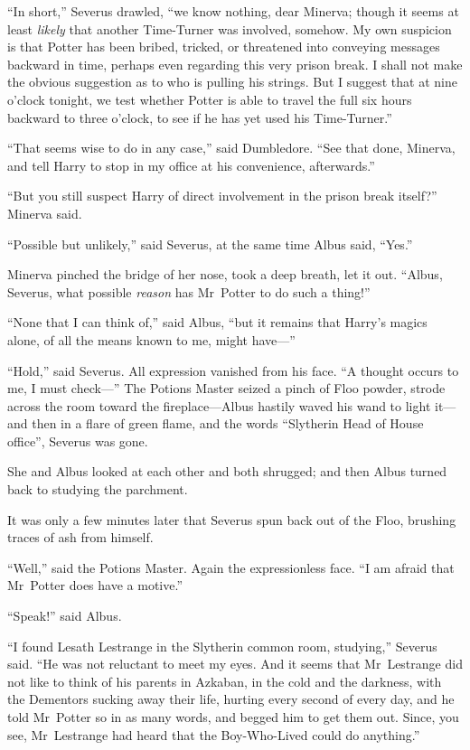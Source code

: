 “In short,” Severus drawled, “we know nothing, dear Minerva; though it seems at least \emph{likely} that another Time-Turner was involved, somehow. My own suspicion is that Potter has been bribed, tricked, or threatened into conveying messages backward in time, perhaps even regarding this very prison break. I shall not make the obvious suggestion as to who is pulling his strings. But I suggest that at nine o’clock tonight, we test whether Potter is able to travel the full six hours backward to three o’clock, to see if he has yet used his Time-Turner.”

“That seems wise to do in any case,” said Dumbledore.
“See that done, Minerva, and tell Harry to stop in my office at his convenience, afterwards.”

“But you still suspect Harry of direct involvement in the prison break itself?” Minerva said.

“Possible but unlikely,” said Severus, at the same time Albus said,
“Yes.”

Minerva pinched the bridge of her nose, took a deep breath, let it out.
“Albus, Severus, what possible \emph{reason} has Mr~Potter to do such a thing!”

“None that I can think of,” said Albus, “but it remains that Harry’s magics alone, of all the means known to me, might have—”

“Hold,” said Severus. All expression vanished from his face.
“A thought occurs to me, I must check—” The Potions Master seized a pinch of Floo powder, strode across the room toward the fireplace—Albus hastily waved his wand to light it—and then in a flare of green flame, and the words
“Slytherin Head of House office”, Severus was gone.

She and Albus looked at each other and both shrugged; and then Albus turned back to studying the parchment.

It was only a few minutes later that Severus spun back out of the Floo, brushing traces of ash from himself.

“Well,” said the Potions Master. Again the expressionless face.
“I am afraid that Mr~Potter does have a motive.”

“Speak!” said Albus.

“I found Lesath Lestrange in the Slytherin common room, studying,” Severus said.
“He was not reluctant to meet my eyes. And it seems that Mr~Lestrange did not like to think of his parents in Azkaban, in the cold and the darkness, with the Dementors sucking away their life, hurting every second of every day, and he told Mr~Potter so in as many words, and begged him to get them out. Since, you see, Mr~Lestrange had heard that the Boy-Who-Lived could do anything.”

